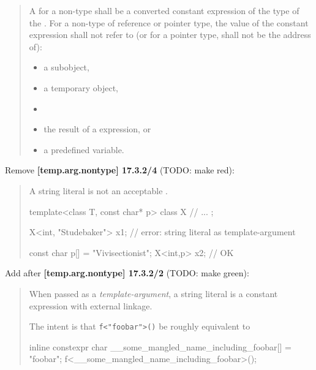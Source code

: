 \documentclass{wg21}
\newcommand{\cc}[1]{\texttt{#1}}
\begin{document}
\begin{quote}
  A  for a non-type 
  shall be a converted constant expression of the type of the
  . For a non-type 
  of reference or pointer type, the value of the constant expression shall not
  refer to (or for a pointer type, shall not be the address of):

  \begin{itemize}
  \item a subobject,
  \item a temporary object,
  \item {}
  \item the result of a  expression, or
  \item a predefined  variable.
  \end{itemize}
\end{quote}

Remove \textbf{[temp.arg.nontype] 17.3.2/4} (TODO: make red):

\begin{quote}
  \begin{note}
  A string literal
  is not an acceptable
  .
  \begin{example}

  \begin{codeblock}
  template<class T, const char* p> class X {
    // ...
  };

  X<int, "Studebaker"> x1;        // error: string literal as template-argument

  const char p[] = "Vivisectionist";
  X<int,p> x2;                    // OK
  \end{codeblock}
  \end{example}
  \end{note}
\end{quote}

Add after \textbf{[temp.arg.nontype] 17.3.2/2} (TODO: make green):

\begin{quote}
  When passed as a \textit{template-argument}, a string literal is a constant
  expression with external linkage.
  \begin{note}
    The intent is that \cc{f<"foobar">()} be roughly equivalent to
    \begin{cpp}
      inline constexpr char __some_mangled_name_including_foobar[] = "foobar";
      f<__some_mangled_name_including_foobar>();
    \end{cpp}
  \end{note}
\end{quote}
\end{document}
